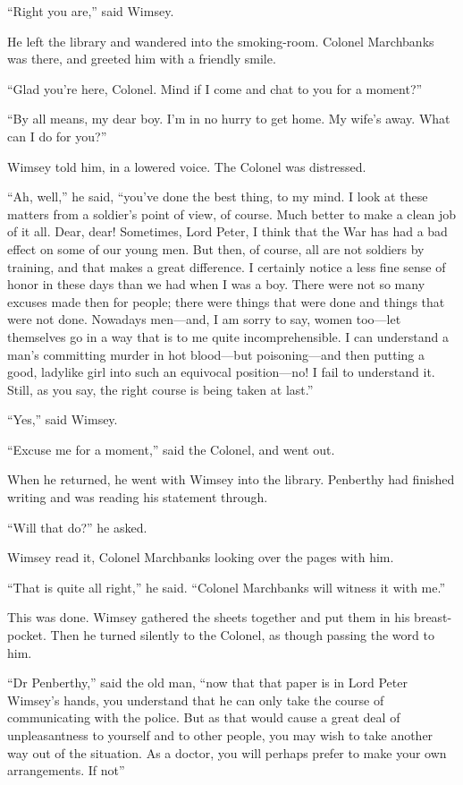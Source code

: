 \enquote{Right you are,} said Wimsey.

He left the library and wandered into the smoking-room. Colonel Marchbanks was there, and greeted him with a friendly smile.

\enquote{Glad you're here, Colonel. Mind if I come and chat to you for a moment?}

\enquote{By all means, my dear boy. I'm in no hurry to get home. My wife's away. What can I do for you?}

Wimsey told him, in a lowered voice. The Colonel was distressed.

\enquote{Ah, well,} he said, \enquote{you've done the best thing, to my mind. I look at these matters from a soldier's point of view, of course. Much better to make a clean job of it all. Dear, dear! Sometimes, Lord Peter, I think that the War has had a bad effect on some of our young men. But then, of course, all are not soldiers by training, and that makes a great difference. I certainly notice a less fine sense of honor in these days than we had when I was a boy. There were not so many excuses made then for people; there were things that were done and things that were not done. Nowadays men\allowbreak---\allowbreak and, I am sorry to say, women too\allowbreak---\allowbreak let themselves go in a way that is to me quite incomprehensible. I can understand a man's committing murder in hot blood\allowbreak---\allowbreak but poisoning\allowbreak---\allowbreak and then putting a good, ladylike girl into such an equivocal position\allowbreak---\allowbreak no! I fail to understand it. Still, as you say, the right course is being taken at last.}

\enquote{Yes,} said Wimsey.

\enquote{Excuse me for a moment,} said the Colonel, and went out.

When he returned, he went with Wimsey into the library. Penberthy had finished writing and was reading his statement through.

\enquote{Will that do?} he asked.

Wimsey read it, Colonel Marchbanks looking over the pages with him.

\enquote{That is quite all right,} he said. \enquote{Colonel Marchbanks will witness it with me.}

This was done. Wimsey gathered the sheets together and put them in his breast-pocket. Then he turned silently to the Colonel, as though passing the word to him.

\enquote{Dr Penberthy,} said the old man, \enquote{now that that paper is in Lord Peter Wimsey's hands, you understand that he can only take the course of communicating with the police. But as that would cause a great deal of unpleasantness to yourself and to other people, you may wish to take another way out of the situation. As a doctor, you will perhaps prefer to make your own arrangements. If not\longdash}

